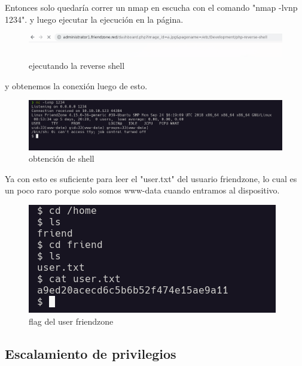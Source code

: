 \documentclass{article}
\begin{document}
Entonces solo quedaría correr un nmap en escucha con el comando "nmap -lvnp 1234".
y luego ejecutar la ejecución en la página.

\begin{figure}[H]
	\center
	\includegraphics[width=\textwidth]{images/friendzone/ejecucion-reverse.png}
	\caption{ejecutando la reverse shell}
\end{figure}

y obtenemos la conexión luego de esto.

\begin{figure}[H]
	\center
	\includegraphics[width=\textwidth]{images/friendzone/shell-obtenida.png}
	\caption{obtención de shell}
\end{figure}

Ya con esto es suficiente para leer el "user.txt" del usuario friendzone, lo cual es un poco raro porque solo somos www-data cuando entramos al dispositivo.

\begin{figure}[H]
	\center
	\includegraphics[width=\textwidth]{images/friendzone/flag-user.png}
	\caption{flag del user friendzone}
\end{figure}


\subsection{Escalamiento de privilegios}
\end{document}
